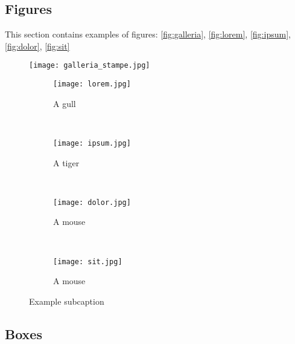 \subsection{Figures}

This section contains examples of figures: \autoref{fig:galleria}, \autoref{fig:lorem}, \autoref{fig:ipsum},
\autoref{fig:dolor}, \autoref{fig:sit}

\begin{figure}[H]
    \centering
    \texttt{[image: galleria\_stampe.jpg]}
    \label{fig:galleria}
\end{figure}

\begin{figure}[H]
    \centering
    \begin{subfigure}[b]{0.45\textwidth}
        \texttt{[image: lorem.jpg]}
        \caption{A gull}
        \label{fig:lorem}
    \end{subfigure}
    ~ %
    \begin{subfigure}[b]{0.45\textwidth}
        \texttt{[image: ipsum.jpg]}
        \caption{A tiger}
        \label{fig:ipsum}
    \end{subfigure}
    ~ %
    \begin{subfigure}[b]{0.45\textwidth}
        \texttt{[image: dolor.jpg]}
        \caption{A mouse}
        \label{fig:dolor}
    \end{subfigure}
    ~ %
    \begin{subfigure}[b]{0.45\textwidth}
        \texttt{[image: sit.jpg]}
        \caption{A mouse}
        \label{fig:sit}
    \end{subfigure}
    \caption{Example subcaption}\label{fig:animals}
\end{figure}

\subsection{Boxes}

